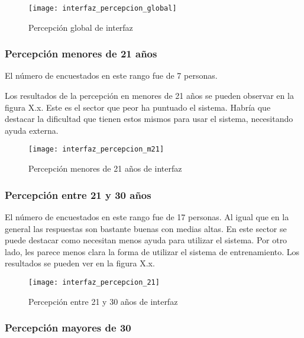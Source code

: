 \begin{figure}[htb]
  \centering
  \texttt{[image: interfaz\_percepcion\_global]}
  \caption[Percepción global de interfaz]{Percepción global de interfaz}
  \label{fig:Percepción global de interfaz}
\end{figure}

\subsubsection{Percepción menores de 21 años}

El número de encuestados en este rango fue de 7 personas.

Los resultados de la percepción en menores de 21 años se pueden observar en la figura X.x.
Este es el sector que peor ha puntuado el sistema. Habría que destacar la dificultad
que tienen estos mismos para usar el sistema, necesitando ayuda externa.

\begin{figure}[htb]
  \centering
  \texttt{[image: interfaz\_percepcion\_m21]}
  \caption[Percepción menores de 21 años de interfaz]{Percepción menores de 21 años de interfaz}
  \label{fig:Percepción menores de 21 años de interfaz}
\end{figure}

\subsubsection{Percepción entre 21 y 30 años}

El número de encuestados en este rango fue de 17 personas. Al igual que en la general las respuestas
son bastante buenas con medias altas. En este sector se puede destacar como necesitan menos ayuda
para utilizar el sistema. Por otro lado, les parece menos clara la forma de utilizar el sistema
de entrenamiento. Los resultados se pueden ver en la figura X.x.

\begin{figure}[htb]
  \centering
  \texttt{[image: interfaz\_percepcion\_21]}
  \caption[Percepción entre 21 y 30 años de interfaz]{Percepción entre 21 y 30 años de interfaz}
  \label{fig:Percepción entre 21 y 30 años de interfaz}
\end{figure}

\subsubsection{Percepción mayores de 30}

